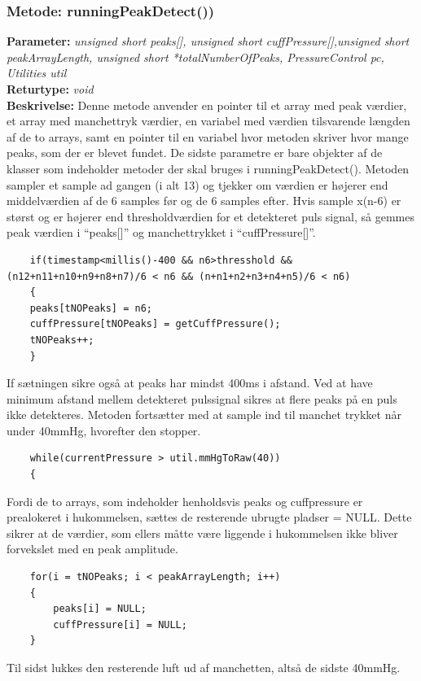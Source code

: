\subsubsection{Metode: runningPeakDetect())}
\textbf{Parameter: } \textit{unsigned short peaks[], unsigned short cuffPressure[],unsigned short peakArrayLength, unsigned short *totalNumberOfPeaks, PressureControl pc, Utilities util}
\\ \textbf{Returtype: } \textit{void}
\\ \textbf{Beskrivelse: } Denne metode anvender en pointer til et array med peak værdier, et array med manchettryk værdier, en variabel med værdien tilsvarende længden af de to arrays, samt en pointer til en variabel hvor metoden skriver hvor mange peaks, som der er blevet fundet. De sidste parametre er bare objekter af de klasser som indeholder metoder der skal bruges i runningPeakDetect().
Metoden sampler et sample ad gangen (i alt 13) og tjekker om værdien er højerer end middelværdien af de 6 samples før og de 6 samples efter. Hvis sample x(n-6) er størst og er højerer end thresholdværdien for et detekteret puls signal, så gemmes peak værdien i “peaks[]” og manchettrykket i “cuffPressure[]”.
\begin{lstlisting}
	if(timestamp<millis()-400 && n6>thresshold && (n12+n11+n10+n9+n8+n7)/6 < n6 && (n+n1+n2+n3+n4+n5)/6 < n6)
	{
	peaks[tNOPeaks] = n6;
	cuffPressure[tNOPeaks] = getCuffPressure();
	tNOPeaks++;
	}
\end{lstlisting}
If sætningen sikre også at peaks har mindst 400ms i afstand. Ved at have minimum afstand mellem detekteret pulssignal sikres at flere peaks på en puls ikke detekteres. Metoden fortsætter med at sample ind til manchet trykket når under 40mmHg, hvorefter den stopper. 
\begin{lstlisting}
	while(currentPressure > util.mmHgToRaw(40))
	{
\end{lstlisting}
Fordi de to arrays, som indeholder henholdsvis peaks og cuffpressure er prealokeret i hukommelsen, sættes de resterende ubrugte pladser = NULL. Dette sikrer at de værdier, som ellers måtte være liggende i hukommelsen ikke bliver forvekslet med en peak amplitude. 
\begin{lstlisting}
	for(i = tNOPeaks; i < peakArrayLength; i++)
	{
		peaks[i] = NULL;
		cuffPressure[i] = NULL;
	}
\end{lstlisting}
Til sidst lukkes den resterende luft ud af manchetten, altså de sidste 40mmHg.
